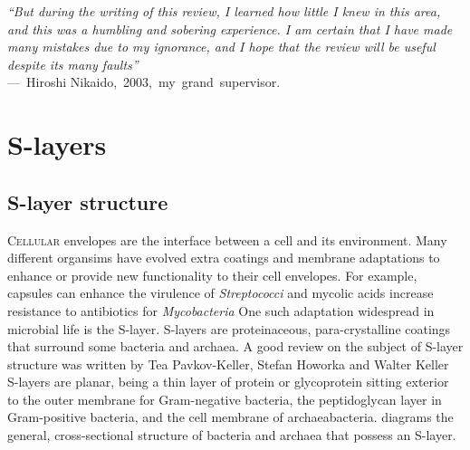 %
\acresetall{}
\label{ch:Introduction}

\begin{epigraph} \emph{``But during the writing of this review, I learned how little I knew in this
    area, and this was a humbling and sobering experience. I am certain that I have made many
    mistakes due to my ignorance, and I hope that the review will be useful despite its many faults''}\\
  ---~Hiroshi Nikaido,~2003,~my~grand~supervisor.
\end{epigraph}
\section{S-layers} \label{sec:intro-slayers}
\subsection{S-layer structure} %
\label{sub:s_layer_structure} \lettrine[lines=2]{C}{ellular} envelopes are the interface between a
cell and its environment. Many different organsims have evolved extra coatings and membrane
adaptations to enhance or provide new functionality to their cell envelopes. For example, capsules
can enhance the virulence of \textit{Streptococci} and mycolic
acids increase resistance to antibiotics for \textit{Mycobacteria}
One such adaptation widespread in microbial life is the \ac{S-layer}. \Acp{S-layer} are
proteinaceous, para-crystalline coatings that surround some bacteria and
archaea. A good review on the subject
of \ac{S-layer} structure was written by Tea Pavkov-Keller, Stefan Howorka and
Walter Keller \Acp{S-layer} are planar, being a
thin layer of protein or glycoprotein sitting exterior to the outer membrane for Gram-negative bacteria, the
peptidoglycan layer in Gram-positive bacteria, and the cell membrane of
archaeabacteria.   diagrams the general,
cross-sectional structure of bacteria and archaea that possess an S-layer.

